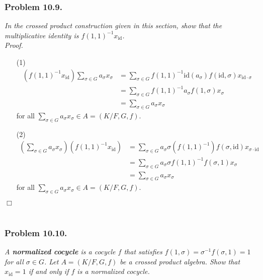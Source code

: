 \documentclass{article}
\begin{document}



\subsubsection*{Problem 10.9.}
\emph{In the crossed product construction given in this section,
show that the multiplicative identity is $f(1,1)^{-1}x_{\mathrm{id}}$.} \\



\emph{Proof.}
\begin{enumerate}
\item[(1)]
  \begin{align*}
    (f(1,1)^{-1}x_{\mathrm{id}}) \sum_{\sigma \in G} a_{\sigma} x_{\sigma}
    &= \sum_{\sigma \in G} f(1,1)^{-1} \mathrm{id}(a_{\sigma}) f(\mathrm{id}, \sigma)
        x_{\mathrm{id} \cdot \sigma} \\
    &= \sum_{\sigma \in G} f(1,1)^{-1} a_{\sigma} f(1, \sigma) x_{\sigma} \\
    &= \sum_{\sigma \in G} a_{\sigma} x_{\sigma}
  \end{align*}
  for all $\sum_{\sigma \in G} a_{\sigma} x_{\sigma} \in A = (K/F,G,f)$.

\item[(2)]
  \begin{align*}
    \left( \sum_{\sigma \in G} a_{\sigma} x_{\sigma} \right)(f(1,1)^{-1}x_{\mathrm{id}})
    &= \sum_{\sigma \in G} a_{\sigma} \sigma(f(1,1)^{-1}) f(\sigma, \mathrm{id})
        x_{\sigma \cdot \mathrm{id}} \\
    &= \sum_{\sigma \in G} a_{\sigma} \sigma f(1,1)^{-1} f(\sigma, 1)
        x_{\sigma} \\
    &= \sum_{\sigma \in G} a_{\sigma} x_{\sigma}
  \end{align*}
  for all $\sum_{\sigma \in G} a_{\sigma} x_{\sigma} \in A = (K/F,G,f)$.
\end{enumerate}
$\Box$ \\\\






\subsubsection*{Problem 10.10.}
\emph{A \textbf{normalized cocycle} is a cocycle $f$ that satisfies
$f(1,\sigma) = \sigma^{-1}f(\sigma,1) = 1$ for all $\sigma \in G$.
Let $A = (K/F,G,f)$ be a crossed product algebra.
Show that $x_{\mathrm{id}} = 1$ if and only if $f$ is a normalized cocycle.} \\
\end{document}
